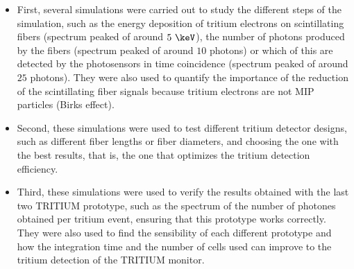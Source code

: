 \begin{itemize}

\item{} First, several simulations were carried out to study the different steps of the simulation, such as the energy deposition of tritium electrons on scintillating fibers (spectrum peaked of around $5~\keV$), the number of photons produced by the fibers (spectrum peaked of around $10$ photons) or which of this are detected by the photosensors in time coincidence (spectrum peaked of around $25$ photons). They were also used to quantify the importance of the reduction of the scintillating fiber signals because tritium electrons are not MIP particles (Birks effect).

\item{} Second, these simulations were used to test different tritium detector designs, such as different fiber lengths or fiber diameters, and choosing the one with the best results, that is, the one that optimizes the tritium detection efficiency.

\item{} Third, these simulations were used to verify the results obtained with the last two TRITIUM prototype, such as the spectrum of the number of photones obtained per tritium event, ensuring that this prototype works correctly. They were also used to find the sensibility of each different prototype and how the integration time and the number of cells used can improve to the tritium detection of the TRITIUM monitor.

\end{itemize}

